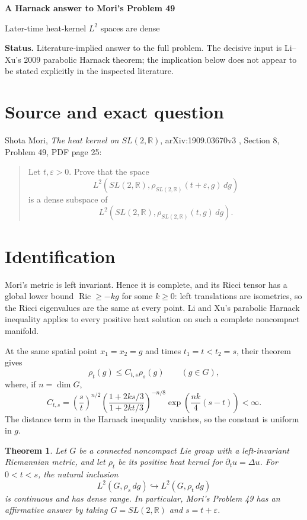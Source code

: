 \documentclass[11pt]{article}
\newtheorem{theorem}{Theorem}
\newcommand{\R}{\mathbb R}
\newcommand{\Ltwo}[1]{L^2\!\left(G,#1\,dg\right)}
\begin{document}
{\color{navy}\LARGE\bfseries A Harnack answer to Mori's Problem 49}\par
\vspace{0.25em}
{\large Later-time heat-kernel $L^2$ spaces are dense}\par
\vspace{0.55em}
\noindent\colorbox{pale}{\parbox{0.965\linewidth}{
\textbf{Status.} Literature-implied answer to the full problem. The decisive
input is Li--Xu's 2009 parabolic Harnack theorem; the implication below does
not appear to be stated explicitly in the inspected literature.
}}

\section*{Source and exact question}

Shota Mori, \emph{The heat kernel on $SL(2,\R)$}, arXiv:1909.03670v3
\cite{Mori}, Section 8, Problem 49, PDF page 25:

\begin{quote}
Let $t,\varepsilon>0$. Prove that the space
\[
L^2\!\left(SL(2,\R),\rho_{SL(2,\R)}(t+\varepsilon,g)\,dg\right)
\]
is a dense subspace of
\[
L^2\!\left(SL(2,\R),\rho_{SL(2,\R)}(t,g)\,dg\right).
\]
\end{quote}

\section*{Identification}

Mori's metric is left invariant. Hence it is complete, and its Ricci tensor
has a global lower bound $\operatorname{Ric}\ge -k g$ for some $k\ge0$:
left translations are isometries, so the Ricci eigenvalues are the same at
every point. Li and Xu's parabolic Harnack inequality
\cite[Theorem~1.4]{LiXu} applies to every positive heat solution on such a
complete noncompact manifold.

At the same spatial point $x_1=x_2=g$ and times $t_1=t<t_2=s$, their theorem
gives
\begin{equation}\label{eq:ratio}
 \rho_t(g)\le C_{t,s}\rho_s(g)\qquad(g\in G),
\end{equation}
where, if $n=\dim G$,
\[
C_{t,s}=\left(\frac{s}{t}\right)^{n/2}
\left(\frac{1+2ks/3}{1+2kt/3}\right)^{-n/8}
\exp\!\left(\frac{nk}{4}(s-t)\right)<\infty.
\]
The distance term in the Harnack inequality vanishes, so the constant is
uniform in $g$.

\begin{theorem}
Let $G$ be a connected noncompact Lie group with a left-invariant Riemannian
metric, and let $\rho_t$ be its positive heat kernel for
$\partial_tu=\Delta u$. For $0<t<s$, the natural inclusion
\[
\Ltwo{\rho_s}\hookrightarrow\Ltwo{\rho_t}
\]
is continuous and has dense range. In particular, Mori's Problem 49 has an
affirmative answer by taking $G=SL(2,\R)$ and $s=t+\varepsilon$.
\end{theorem}
\end{document}
